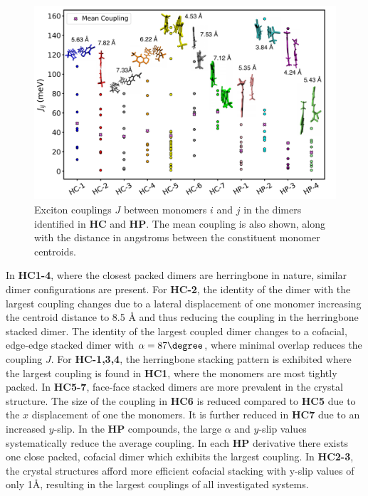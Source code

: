 \begin{figure}
\centering
  \includegraphics[width=0.8\linewidth]{couplings}
  \caption[Exciton couplings in \textbf{HC} and \textbf{HP} systems]{Exciton couplings $J$ between monomers $i$ and $j$ in the dimers identified in \textbf{HC} and \textbf{HP}. The mean coupling is also shown, along with the distance in angstroms between the constituent monomer centroids.}
  \label{figure: couplings}
\end{figure}

In \textbf{HC1-4}, where the closest packed dimers are herringbone in nature, similar dimer configurations are present. For \textbf{HC-2}, the identity of the dimer with the largest coupling changes due to a lateral displacement of one monomer increasing the centroid distance to 8.5 {\AA} and thus reducing the coupling in the herringbone stacked dimer. The identity of the largest coupled dimer changes to a cofacial, edge-edge stacked dimer with $\alpha=87\degree$, where minimal overlap reduces the coupling $J$. For \textbf{HC-1,3,4}, the herringbone stacking pattern is exhibited where the largest coupling is found in \textbf{HC1}, where the monomers are most tightly packed. In \textbf{HC5-7}, face-face stacked dimers are more prevalent in the crystal structure. The size of the coupling in \textbf{HC6} is reduced compared to \textbf{HC5} due to the $x$ displacement of one the monomers. It is further reduced in \textbf{HC7} due to an increased $y$-slip. In the \textbf{HP} compounds, the large $\alpha$ and $y$-slip values systematically reduce the average coupling. In each \textbf{HP} derivative there exists one close packed, cofacial dimer which exhibits the largest coupling. In \textbf{HC2-3}, the crystal structures afford more efficient cofacial stacking with y-slip values of only 1{\AA}, resulting in the largest couplings of all investigated systems. 

